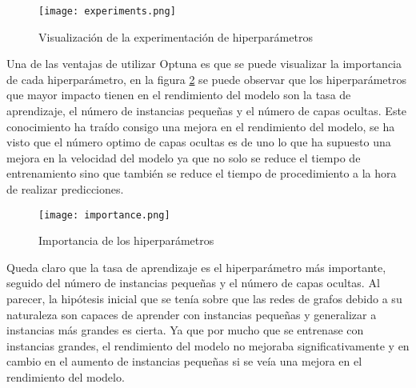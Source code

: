 \begin{figure}[ht]
    \centering
    \texttt{[image: experiments.png]}
    \caption{Visualización de la experimentación de hiperparámetros}
    \label{fig:experiments}
\end{figure}

Una de las ventajas de utilizar Optuna es que se puede visualizar la importancia de cada
hiperparámetro, en la figura \ref{fig:importance} se puede observar que los hiperparámetros
que mayor impacto tienen en el rendimiento del modelo son la tasa de aprendizaje, el número
de instancias pequeñas y el número de capas ocultas. Este conocimiento ha traído consigo
una mejora en el rendimiento del modelo, se ha visto que el número optimo de capas ocultas 
es de uno lo que ha supuesto una mejora en la velocidad del modelo ya que no solo se reduce 
el tiempo de entrenamiento sino que también se reduce el tiempo de procedimiento a la hora 
de realizar predicciones.

\begin{figure}[ht!]
    \centering
    \texttt{[image: importance.png]}
    \caption{Importancia de los hiperparámetros}
    \label{fig:importance}
\end{figure}

Queda claro que la tasa de aprendizaje es el hiperparámetro más importante, seguido
del número de instancias pequeñas y el número de capas ocultas. Al parecer, la hipótesis
inicial que se tenía sobre que las redes de grafos debido a su naturaleza son capaces de
aprender con instancias pequeñas y generalizar a instancias más grandes es cierta. Ya que
por mucho que se entrenase con instancias grandes, el rendimiento del modelo no mejoraba
significativamente y en cambio en el aumento de instancias pequeñas si se veía una mejora
en el rendimiento del modelo.
